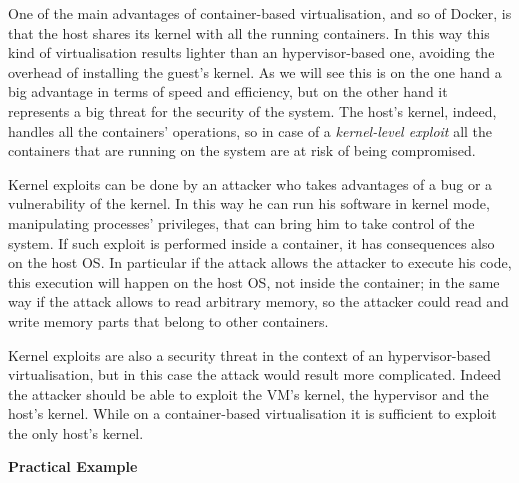 \documentclass[a4paper,12pt]{article}
\begin{document}
One of the main advantages of container-based virtualisation, and so of Docker,
is that the host shares its kernel with all the running containers. In this way
this kind of virtualisation results lighter than an hypervisor-based one,
avoiding the overhead of installing the guest's kernel. As we will see this is
on the one hand a big advantage in terms of speed and efficiency, but on the
other hand it represents a big threat for the security of the system. The host's
kernel, indeed, handles all the containers' operations, so in case of a
\textit{kernel-level exploit} all the containers that are running on the system
are at risk of being compromised.\par Kernel exploits can be done by an attacker
who takes advantages of a bug or a vulnerability of the kernel. In this way he
can run his software in kernel mode, manipulating processes' privileges, that
can bring him to take control of the system. If such exploit is performed inside
a container, it has consequences also on the host OS. In particular if the
attack allows the attacker to execute his code, this execution will happen on
the host OS, not inside the container; in the same way if the attack allows to
read arbitrary memory, so the attacker could read and write memory parts that
belong to other containers.\par Kernel exploits are also a security threat in
the context of an hypervisor-based virtualisation, but in this case the attack
would result more complicated. Indeed the attacker should be able to exploit the
VM's kernel, the hypervisor and the host's kernel. While on a container-based
virtualisation it is sufficient to exploit the only host's kernel.

\bigbreak\textbf{Practical Example}\bigbreak 
\end{document}
